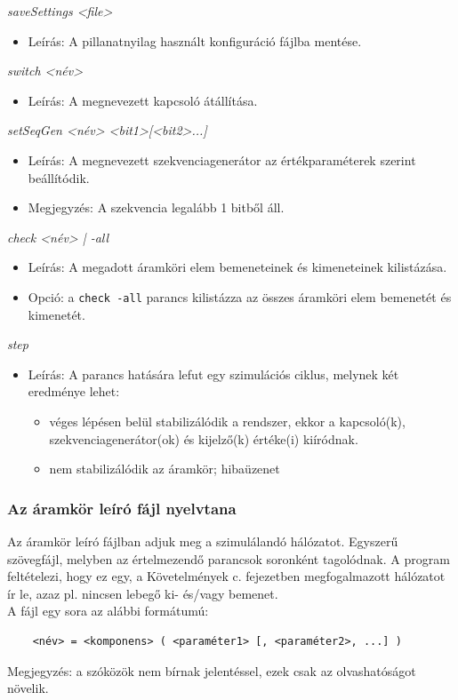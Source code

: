 \textit{saveSettings <file>}
\begin{itemize}
	\item Leírás: A pillanatnyilag használt konfiguráció fájlba mentése.
\end{itemize}

\textit{switch <név>}
\begin{itemize}
	\item Leírás: A megnevezett kapcsoló átállítása.
\end{itemize}

\textit{setSeqGen <név> <bit1>[<bit2>...]}
\begin{itemize}
	\item Leírás: A megnevezett szekvenciagenerátor az értékparaméterek szerint beállítódik.
	\item Megjegyzés: A szekvencia legalább 1 bitből áll.
\end{itemize}

\textit{check <név> | -all}
\begin{itemize}
	\item Leírás: A megadott áramköri elem bemeneteinek és kimeneteinek kilistázása.
	\item Opció: a \texttt{check -all} parancs kilistázza az összes áramköri elem bemenetét és kimenetét.
\end{itemize}

\textit{step}
\begin{itemize}
	\item Leírás: A parancs hatására lefut egy szimulációs ciklus, melynek két eredménye lehet:
	\begin{itemize}
		\item véges lépésen belül stabilizálódik a rendszer, ekkor a kapcsoló(k), szekvenciagenerátor(ok) és kijelző(k) értéke(i) kiíródnak.
		\item nem stabilizálódik az áramkör; hibaüzenet
	\end{itemize}
\end{itemize}

\subsubsection{Az áramkör leíró fájl nyelvtana}
\label{sec:circuit_def}
Az áramkör leíró fájlban adjuk meg a szimulálandó hálózatot. Egyszerű szövegfájl, melyben az értelmezendő parancsok soronként tagolódnak. A program feltételezi, hogy ez egy, a Követelmények c. fejezetben megfogalmazott hálózatot ír le, azaz pl. nincsen lebegő ki- és/vagy bemenet.\\
A fájl egy sora az alábbi formátumú:
\begin{verbatim}
	<név> = <komponens> ( <paraméter1> [, <paraméter2>, ...] )
\end{verbatim}
Megjegyzés: a szóközök nem bírnak jelentéssel, ezek csak az olvashatóságot növelik.\\

